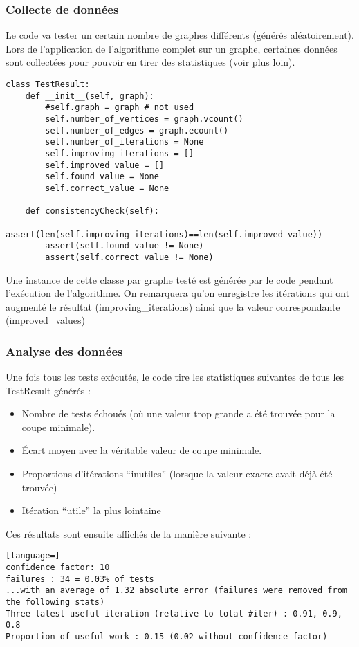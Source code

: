 \documentclass[a4paper,10pt]{article}
\begin{document}
\subsubsection{Collecte de données}
Le code va tester un certain nombre de graphes différents (générés aléatoirement). Lors de l'application de l'algorithme complet sur un graphe, certaines données sont collectées pour pouvoir en tirer des statistiques (voir plus loin).
\begin{lstlisting}
class TestResult:
	def __init__(self, graph):
		#self.graph = graph # not used
		self.number_of_vertices = graph.vcount()
		self.number_of_edges = graph.ecount()
		self.number_of_iterations = None
		self.improving_iterations = []
		self.improved_value = []
		self.found_value = None
		self.correct_value = None

	def consistencyCheck(self):
		assert(len(self.improving_iterations)==len(self.improved_value))
		assert(self.found_value != None)
		assert(self.correct_value != None)
\end{lstlisting}
Une instance de cette classe par graphe testé est générée par le code pendant l'exécution de l'algorithme.
On remarquera qu'on enregistre les itérations qui ont augmenté le résultat (improving\_iterations) ainsi que la valeur correspondante (improved\_values)

\subsubsection{Analyse des données}
Une fois tous les tests exécutés, le code tire les statistiques suivantes de tous les TestResult générés :
\begin{itemize}
 \item Nombre de tests échoués (où une valeur trop grande a été trouvée pour la coupe minimale).
 \item Écart moyen avec la véritable valeur de coupe minimale.
 \item Proportions d'itérations ``inutiles'' (lorsque la valeur exacte avait déjà été trouvée)
 \item Itération ``utile'' la plus lointaine
\end{itemize}

Ces résultats sont ensuite affichés de la manière suivante :
\begin{lstlisting}[language=]
confidence factor: 10
failures : 34 = 0.03% of tests
...with an average of 1.32 absolute error (failures were removed from the following stats)
Three latest useful iteration (relative to total #iter) : 0.91, 0.9, 0.8
Proportion of useful work : 0.15 (0.02 without confidence factor)
\end{lstlisting}
\end{document}
